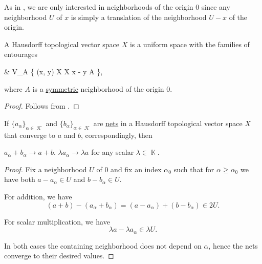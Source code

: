 \begin{remark}\label{rem:origin_neighborhoods_in_topological_vector_spaces}
  As in , we are only interested in neighborhoods of the origin \( 0 \) since any neighborhood \( U \) of \( x \) is simply a translation of the neighborhood \( U - x \) of the origin.
\end{remark}

\begin{proposition}\label{thm:topological_vector_space_is_uniform}
  A Hausdorff topological vector space \( X \) is a uniform space with the families of entourages
  \begin{balign*}
     & V_A \coloneqq \{ (x, y) \in X \times X \colon x - y \in A \},
  \end{balign*}
  where \( A \) is a \hyperref[def:neighborhood_set_types/symmetric]{symmetric} neighborhood of the origin \( 0 \).
\end{proposition}
\begin{proof}
  Follows from .
\end{proof}

\begin{proposition}\label{thm:linearity_of_sequence_limits}
  If \( \{ a_\alpha \}_{\alpha \in \mscrK} \) and \( \{ b_\alpha \}_{\alpha \in \mscrK} \) are \hyperref[def:topological_net]{nets} in a Hausdorff topological vector space \( X \) that converge to \( a \) and \( b \), correspondingly, then
  \begin{propenum}
     \( a_\alpha + b_\alpha \to a + b \).
     \( \lambda a_\alpha \to \lambda a \) for any scalar \( \lambda \in \BbbK \).
  \end{propenum}
\end{proposition}
\begin{proof}
  Fix a neighborhood \( U \) of \( 0 \) and fix an index \( \alpha_0 \) such that for \( \alpha \geq \alpha_0 \) we have both \( a - a_\alpha \in U \) and \( b - b_\alpha \in U \).

   For addition, we have
  \begin{equation*}
    (a + b) - (a_\alpha + b_\alpha) = (a - a_\alpha) + (b - b_\alpha) \in 2U.
  \end{equation*}

   For scalar multiplication, we have
  \begin{equation*}
    \lambda a - \lambda a_\alpha \in \lambda U.
  \end{equation*}

  In both cases the containing neighborhood does not depend on \( \alpha \), hence the nets converge to their desired values.
\end{proof}

